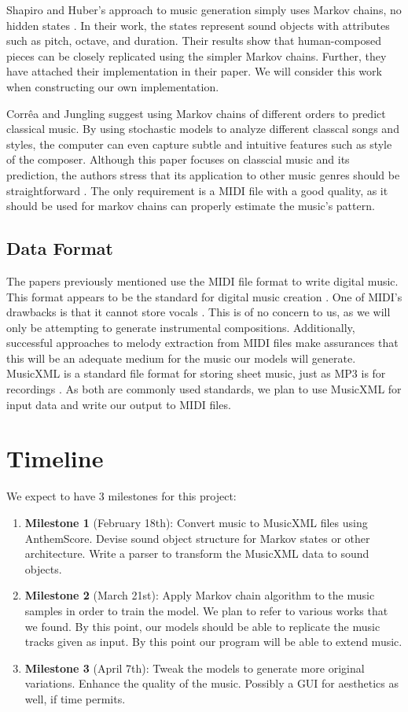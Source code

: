 \documentclass{article}
\begin{document}
Shapiro and Huber's approach to music generation simply uses Markov chains, no hidden states \cite{shapiro_huber_2021}. In their work, the states represent sound 
objects with attributes such as pitch, octave, and duration. Their results show that human-composed pieces can be closely replicated using the simpler Markov chains. 
Further, they have attached their implementation in their paper. We will consider this work when constructing our own implementation.

Corrêa and Jungling suggest using Markov chains of different orders to predict classical music. By using stochastic models to analyze different classcal songs and styles,
the computer can even capture subtle and intuitive features such as style of the composer. Although this paper focuses on classcial music and its prediction, the authors 
stress that its application to other music genres should be straightforward \cite{correa_jungling_small_2020}.
The only requirement is a MIDI file with a good quality, as it should be used for markov chains can properly estimate the music's pattern.

\subsection{Data Format}
The papers previously mentioned use the MIDI file format to write digital music. This format appears to be the standard for digital music creation \cite{midi_format}. 
One of MIDI's drawbacks is that it cannot store vocals \cite{cataltepe_2007}. This is of no concern to us, as we will only be attempting to generate instrumental 
compositions. Additionally, successful approaches to melody extraction from MIDI files \cite{ozcan_2005} make assurances that this will be an adequate medium for the 
music our models will generate. MusicXML is a standard file format for storing sheet music, just as MP3 is for recordings \cite{musicxml_2022}. As both are commonly used 
standards, we plan to use MusicXML for input data and write our output to MIDI files.

\section{Timeline}
We expect to have 3 milestones for this project:
\begin{enumerate}
  \item \textbf{Milestone 1} (February 18th): Convert music to MusicXML files using AnthemScore. Devise sound object structure for Markov states or other architecture. 
  Write a parser to transform the MusicXML data to sound objects. 
  \item \textbf{Milestone 2} (March 21st): Apply Markov chain algorithm to the music samples in order to train the model. We plan to refer to various works that we found.
  By this point, our models should be able to replicate the music tracks given as input. By this point our program will be able to extend music.
  \item \textbf{Milestone 3} (April 7th): Tweak the models to generate more original variations. Enhance the quality of the music. Possibly a GUI for aesthetics as well, 
  if time permits.
\end{enumerate}
\end{document}
